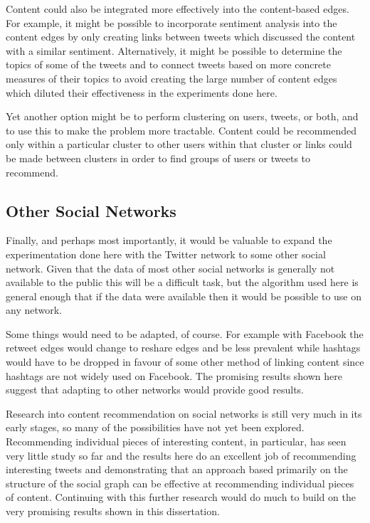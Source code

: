 Content could also be integrated more effectively into the content-based edges. For example, it might be possible to incorporate sentiment analysis into the content edges by only creating links between tweets which discussed the content with a similar sentiment. Alternatively, it might be possible to determine the topics of some of the tweets and to connect tweets based on more concrete measures of their topics to avoid creating the large number of content edges which diluted their effectiveness in the experiments done here.

Yet another option might be to perform clustering on users, tweets, or both, and to use this to make the problem more tractable. Content could be recommended only within a particular cluster to other users within that cluster or links could be made between clusters in order to find groups of users or tweets to recommend.

\subsection{Other Social Networks}

Finally, and perhaps most importantly, it would be valuable to expand the experimentation done here with the Twitter network to some other social network. Given that the data of most other social networks is generally not available to the public this will be a difficult task, but the algorithm used here is general enough that if the data were available then it would be possible to use on any network.

Some things would need to be adapted, of course. For example with Facebook the retweet edges would change to reshare edges and be less prevalent while hashtags would have to be dropped in favour of some other method of linking content since hashtags are not widely used on Facebook. The promising results shown here suggest that adapting to other networks would provide good results.

Research into content recommendation on social networks is still very much in its early stages, so many of the possibilities have not yet been explored. Recommending individual pieces of interesting content, in particular, has seen very little study so far and the results here do an excellent job of recommending interesting tweets and demonstrating that an approach based primarily on the structure of the social graph can be effective at recommending individual pieces of content. Continuing with this further research would do much to build on the very promising results shown in this dissertation. 

